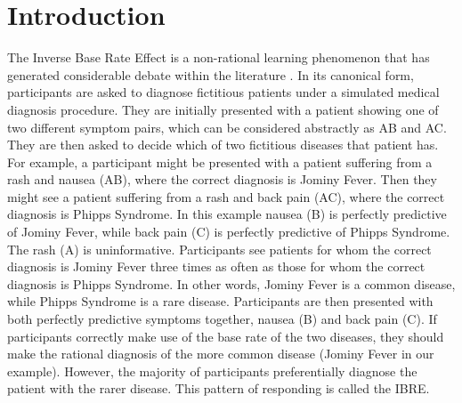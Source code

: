 \documentclass[twocolumn]{article}
\begin{document}
{\renewcommand{\thefootnote}{}
}

\saythanks

\setlength{\baselineskip}{12pt plus.2pt}

\section{Introduction}

The Inverse Base Rate Effect \cite[IBRE;][]{Medin1988} is a non-rational learning phenomenon that has generated considerable debate within the literature \citep{Kruschke1996a, Kruschke2001b, Juslin2001, Kruschke2003, Winman2003, Bohil2005, Don2021}. In its canonical form, participants are asked to diagnose fictitious patients under a simulated medical diagnosis procedure. They are initially presented with a patient showing one of two different symptom pairs, which can be considered abstractly as AB and AC. They are then asked to decide which of two fictitious diseases that patient has. For example, a participant might be presented with a patient suffering from a rash and nausea (AB), where the correct diagnosis is Jominy Fever. Then they might see a patient suffering from  a rash and back pain (AC), where the correct diagnosis is Phipps Syndrome. In this example nausea (B) is perfectly predictive of Jominy Fever, while back pain (C) is perfectly predictive of Phipps Syndrome. The rash (A) is uninformative. Participants see patients for whom the correct diagnosis is Jominy Fever three times as often as those for whom the correct diagnosis is Phipps Syndrome. In other words, Jominy Fever is a common disease, while  Phipps Syndrome is a rare disease. Participants are then presented with both perfectly predictive symptoms together, nausea (B) and back pain (C). If participants correctly make use of the base rate of the two diseases, they should make the rational diagnosis of the more common disease (Jominy Fever in our example). However, the majority of participants preferentially diagnose the patient with the rarer disease. This pattern of responding is called the IBRE.
\end{document}
